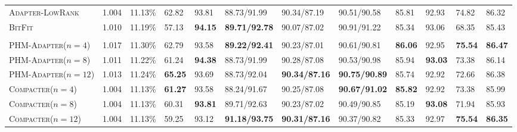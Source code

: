 \documentclass{article}
\newcommand{\adapterlowrank}{\textsc{Adapter-LowRank}\xspace}
\newcommand{\compacter}{\textsc{Compacter}\xspace}
\newcommand{\phmadapter}{\textsc{PHM-Adapter}\xspace}
\newcommand{\prompttuning}{\textsc{Prompt Tuning}\xspace}
\newcommand{\bitfit}{\textsc{BitFit}\xspace}
\begin{document}
\begin{table}[H]
\begin{adjustbox}{max width=\textwidth}
\begin{tabular}{l@{\hskip 0.02in}|l@{\hskip 0.06in}l@{\hskip 0.0in}|l@{\hskip 0.08in}l@{\hskip 0.08in}l@{\hskip 0.08in}l@{\hskip 0.08in}l@{\hskip 0.08in}l@{\hskip 0.08in}l@{\hskip 0.08in}l|l}
\adapterlowrank & 1.004 & 11.13\% & 62.82 &  93.81 &  88.73/91.99 &  90.34/87.19 &  90.51/90.58 &  85.81 &  92.93 &  74.82 &  86.32  \\ 
\bitfit & 1.010 &11.19\%&57.13 &  \textbf{94.15} &  \textbf{89.71/92.78} &  90.07/87.02 &  90.91/91.22 &  85.34 &  93.06 &  68.35 &  85.43 \\%
\midrule 
\rowcolor{gray!20}\multicolumn{12}{c}{\it \textbf{Our Proposed Methods}}\\
\midrule 
\phmadapter ($n=4$)& 1.017 & 11.30\% & 62.79 &  93.58 &  \textbf{89.22/92.41} &  90.23/87.01 &  90.61/90.81 &  \textbf{86.06} &  92.95 &  \textbf{75.54} &  \textbf{86.47} \\%
\phmadapter ($n=8$)& 1.011 & 11.22\% & 61.24 &  \textbf{94.38} &  88.73/91.99 &  90.28/87.08 &  90.53/90.98 &  85.94 &  \textbf{93.03} &  73.38 &  86.14 \\%
\phmadapter ($n=12$)& 1.013 & 11.24\%& \textbf{65.25} &  93.69 &  88.73/92.04 &  \textbf{90.34/87.16} &  \textbf{90.75/90.89} &  85.74 &  92.92 &  72.66 &  86.38 \\%
\midrule 
\compacter ($n=4$) & 1.004 & 11.13\% & \textbf{61.27} &  93.58 &  88.24/91.67 &  90.25/87.08 &  \textbf{90.67/91.02} &  \textbf{85.82} &  92.92 &  73.38 &  85.99\\%
\compacter ($n=8$) & 1.004 & 11.13\% &  60.31 &  \textbf{93.81} &  89.71/92.63 &  90.23/87.02 &  90.49/90.85 &  85.19 &  \textbf{93.08} &  71.94 &  85.93 \\%
\compacter ($n=12$) & 1.004 & 11.13\% & 59.25 &  93.12 &  \textbf{91.18/93.75} &  \textbf{90.31/87.16} &  90.37/90.82 &  85.33 &  92.97 &  \textbf{75.54} &  \textbf{86.35} \\ %

\end{tabular}
\end{adjustbox}
\end{table}
\end{document}
